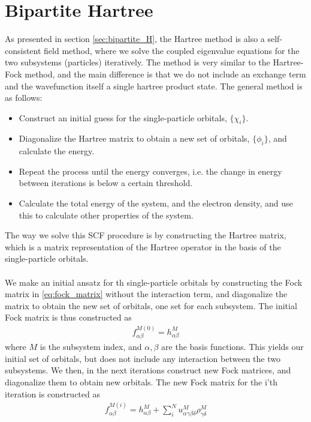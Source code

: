 \documentclass{subfiles}
\begin{document}
\section{Bipartite Hartree}
As presented in section \ref{sec:bipartite_H}, the Hartree method is also a self-consistent field method, where we solve the coupled eigenvalue equations for the two subsystems (particles) iteratively. The method is very similar to the Hartree-Fock method, and the main difference is that we do not include an exchange term and the wavefunction itself a single hartree product state. The general method is as follows:
\begin{itemize}
    \item Construct an initial guess for the single-particle orbitals, $\{\chi_i\}$.
    \item Diagonalize the Hartree matrix to obtain a new set of orbitals, $\{\phi_i\}$, and calculate the energy.
    \item Repeat the process until the energy converges, i.e. the change in energy between iterations is below a certain threshold.
    \item Calculate the total energy of the system, and the electron density, and use this to calculate other properties of the system.
\end{itemize}
The way we solve this SCF procedure is by constructing the Hartree matrix, which is a matrix representation of the Hartree operator in the basis of the single-particle orbitals. \\ \\
We make an initial ansatz for th single-particle orbitals by constructing the Fock matrix in \eqref{eq:fock_matrix} without the interaction term, and diagonalize the matrix to obtain the new set of orbitals, one set for each subsystem. The initial Fock matrix is thus constructed as
\begin{align*}
    f_{\alpha\beta}^{M(0)} = h_{\alpha\beta}^M
\end{align*}
where $M$ is the subsystem index, and $\alpha, \beta$ are the basis functions. This yields our initial set of orbitals, but does not include any interaction between the two subsystems. We then, in the next iterations construct new Fock matrices, and diagonalize them to obtain new orbitals. The new Fock matrix for the i'th iteration is constructed as
\begin{align*}
    f_{\alpha\beta}^{M(i)} = h_{\alpha\beta}^M + \sum_{i}^{N} u_{\alpha\gamma\beta\delta}^{M} \rho_{\gamma\delta}^{M}
\end{align*}
\end{document}
